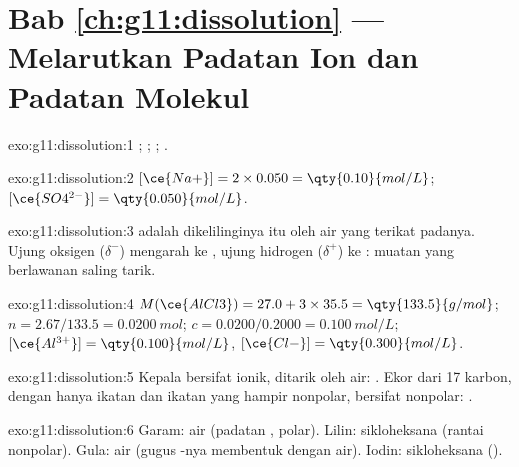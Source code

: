 \section*{Bab \ref{ch:g11:dissolution} --- Melarutkan Padatan Ion dan Padatan Molekul}

\begin{solution}{exo:g11:dissolution:1}
;
;
;
.
\end{solution}

\begin{solution}{exo:g11:dissolution:2}
$[\ce{Na+}] = 2 \times 0.050 = \qty{0.10}{mol/L}$;
$[\ce{SO4^{2-}}] = \qty{0.050}{mol/L}$.
\end{solution}

\begin{solution}{exo:g11:dissolution:3}
 adalah dikelilinginya  itu oleh  air yang
terikat padanya. Ujung oksigen ($\delta^-$) mengarah ke , ujung
hidrogen ($\delta^+$) ke : muatan yang berlawanan saling tarik.
\end{solution}

\begin{solution}{exo:g11:dissolution:4}
$M(\ce{AlCl3}) = 27.0 + 3 \times 35.5 = \qty{133.5}{g/mol}$;
$n = 2.67 / 133.5 = \qty{0.0200}{mol}$; $c = 0.0200 / 0.2000 =
\qty{0.100}{mol/L}$; $[\ce{Al^{3+}}] = \qty{0.100}{mol/L}$,
$[\ce{Cl-}] = \qty{0.300}{mol/L}$.
\end{solution}

\begin{solution}{exo:g11:dissolution:5}
Kepala  bersifat ionik, ditarik oleh air: . Ekor
dari 17  karbon, dengan hanya ikatan  dan ikatan 
yang hampir nonpolar, bersifat nonpolar: .
\end{solution}

\begin{solution}{exo:g11:dissolution:6}
Garam: air (padatan ,  polar). Lilin: sikloheksana (rantai
nonpolar). Gula: air (gugus -nya membentuk 
dengan air). Iodin: sikloheksana ().
\end{solution}

